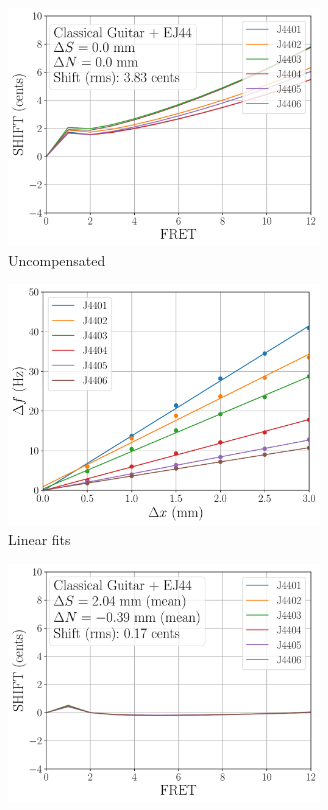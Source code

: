  \begin{figure}
  \centering
  \begin{subfigure}[b]{0.45\textwidth}
   \centering
   \includegraphics[width=3.25in]{../figures/shift_classicalguitar_ej44_null}
   \caption{Uncompensated}
   \label{fig:shift_classicalguitar_ej44_null}
  \end{subfigure}
  \hspace{0.25in}
  \begin{subfigure}[b]{0.45\textwidth}
   \centering
   \includegraphics[width=3.25in]{../figures/fit_ej44}
   \caption{Linear fits}
   \label{fig:fit_ej44}
  \end{subfigure}
  \par\vspace{0.25in}
  \begin{subfigure}[b]{0.45\textwidth}
   \centering
   \includegraphics[width=3.25in]{../figures/shift_classicalguitar_ej44_full}

\end{subfigure}
\end{figure}
